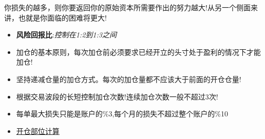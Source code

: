 你损失的越多，则你要返回你的原始资本所需要作出的努力越大!从另一个侧面来讲，也就是你面临的困难将更大!

\begin{itemize}
\item \textbf{风险回报比}:\textit{控制在1:2到1:3之间}
\item 加仓的基本原则，每次加仓前必须要求已经开立的头寸处于盈利的情况下才能加仓! 
\item 坚持递减仓量的加仓方式。每次的加仓量都不应该大于前面的开仓仓量!
\item 根据交易波段的长短控制加仓次数!连续加仓次数一般不超过3次!
\item 每单最大损失只能是账户的\%3,每个月的损失不超过整个账户的\%10
\item \href{run:Risk Position Size Calculation.xlsx}{开仓部位计算} 
\end{itemize}








